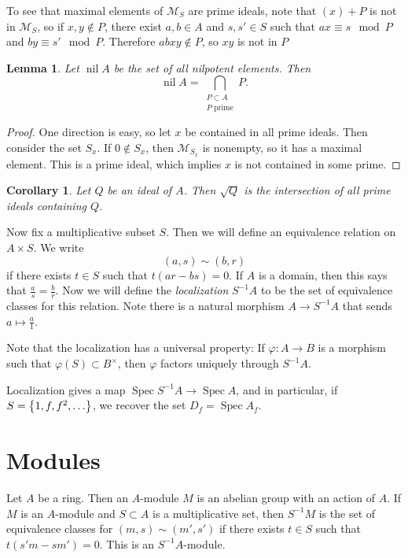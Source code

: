 \documentclass[leqno, openany]{memoir}
\newtheorem{cor}[thm]{Corollary}
\newtheorem{lem}[thm]{Lemma}
\theoremstyle{definition}
\theoremstyle{remark}
\theoremstyle{plain}
\theoremstyle{definition}
\theoremstyle{remark}
\newcommand{\mc}[1]{\mathcal{#1}}
\DeclareMathOperator{\spec}{Spec}
\begin{document}
To see that maximal elements of $\mc{M}_S$ are prime ideals, note that $(x) + P$ is not in $\mc{M}_S$, so if $x,y \notin P$, there exist $a,b \in A$ and $s,s' \in S$ such that $ax \equiv s \mod P$ and $by \equiv s' \mod P$. Therefore $abxy \notin P$, so $xy$ is not in $P$

\begin{lem}
Let $\operatorname{nil} A$ be the set of all nilpotent elements. Then 
\[ \operatorname{nil} A = \bigcap_{\substack{P \subset A \\ P \text{ prime}}} P. \]
\end{lem}

\begin{proof}
    One direction is easy, so let $x$ be contained in all prime ideals. Then consider the set $S_x$. If $0 \notin S_x$, then $\mc{M}_{S_x}$ is nonempty, so it has a maximal element. This is a prime ideal, which implies $x$ is not contained in some prime.
\end{proof}

\begin{cor}
    Let $Q$ be an ideal of $A$. Then $\sqrt{Q}$ is the intersection of all prime ideals containing $Q$.
\end{cor}

Now fix a multiplicative subset $S$. Then we will define an equivalence relation on $A \times S$. We write
\[ (a,s) \sim (b,r) \]
if there exists $t \in S$ such that $t(ar - bs) = 0$. If $A$ is a domain, then this says that $\frac{a}{s} = \frac{b}{r}$. Now we will define the \textit{localization} $S^{-1}A$ to be the set of equivalence classes for this relation. Note there is a natural morphism $A \to S^{-1}A$ that sends $a \mapsto \frac{a}{1}$.

Note that the localization has a universal property: If $\varphi:A \to B$ is a morphism such that $\varphi(S) \subset B^{\times}$, then $\varphi$ factors uniquely through $S^{-1}A$.

Localization gives a map $\spec S^{-1}A \to \spec A$, and in particular, if $S = \qty{1, f, f^2, \ldots}$, we recover the set $D_f = \spec A_f$.

\section{Modules}%
\label{sec:modules}

Let $A$ be a ring. Then an $A$-module $M$ is an abelian group with an action of $A$. If $M$ is an $A$-module and $S \subset A$ is a multiplicative set, then $S^{-1}M$ is the set of equivalence classes for $(m,s) \sim (m',s')$ if there exists $t \in S$ such that $t(s'm - sm') = 0$. This is an $S^{-1}A$-module.
\end{document}
